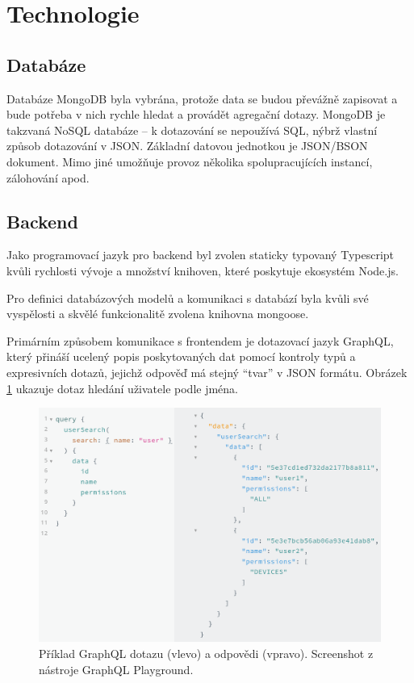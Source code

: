 \section{Technologie}

\subsection{Databáze}

\noindent
Databáze MongoDB byla vybrána, protože data se budou převážně zapisovat a bude potřeba v nich rychle
hledat a provádět agregační dotazy.
MongoDB je takzvaná NoSQL databáze -- k dotazování se nepoužívá SQL, nýbrž vlastní způsob dotazování v
JSON. Základní datovou jednotkou je JSON/BSON dokument.
Mimo jiné umožňuje provoz několika spolupracujících instancí, zálohování apod. \citep[][]{MongoDB}

\subsection{Backend} \label{backend}

\noindent
Jako programovací jazyk pro backend byl zvolen staticky typovaný Typescript kvůli rychlosti vývoje
a množství knihoven, které poskytuje ekosystém Node.js. \citep[][]{Typescript} \citep[][]{Nodejs}

Pro definici databázových modelů a komunikaci s databází byla kvůli své vyspělosti a skvělé funkcionalitě zvolena
knihovna mongoose. \citep[][]{Mongoose}

Primárním způsobem komunikace s frontendem
je dotazovací jazyk GraphQL, který přináší ucelený popis poskytovaných dat pomocí kontroly typů a
expresivních dotazů, jejichž odpověď má stejný ``tvar'' v JSON formátu. 
Obrázek \ref{fig:graphql_example} ukazuje dotaz hledání uživatele podle jména.

\begin{figure} \centering
\includegraphics[width=145mm]{../img/graphql_example.png}
\caption[Příklad GraphQL dotazu z nástroje GraphQLPlayground.]{Příklad GraphQL dotazu (vlevo) a odpovědi (vpravo).
Screenshot z nástroje GraphQL Playground.}
\label{fig:graphql_example}
\end{figure}

